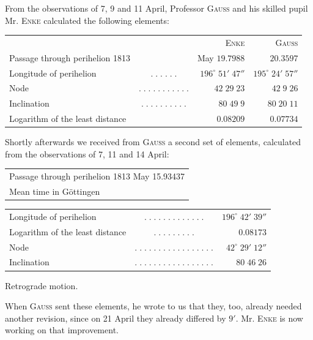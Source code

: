 \par\indent From the observations of 7, 9 and 11 April, Professor \textsc{Gauss} and his skilled pupil Mr. \textsc{Enke} calculated the following elements:

\begin{center}\fontsize{9}{11}\selectfont\setlength{\tabcolsep}{5pt}\renewcommand{\arraystretch}{1.15}\begin{tabular}{lcrr}
& & \textsc{Enke} & \textsc{Gauss}\\
Passage through perihelion 1813 & & May $19.7988$ & $20.3597$\\
Longitude of perihelion & $.\;.\;.\;.\;.\;.$ & $196^\circ\;51'\;47''$ & $195^\circ\;24'\;57''$\\
Node & $.\;.\;.\;.\;.\;.\;.\;.\;.\;.\;.$ & $42\;29\;23$ & $42\;9\;26$\\
Inclination & $.\;.\;.\;.\;.\;.\;.\;.\;.\;.$ & $80\;49\;9$ & $80\;20\;11$\\
Logarithm of the least distance &  & $0.08209$ & $0.07734$\\
\end{tabular}\end{center}

\par\indent Shortly afterwards we received from \textsc{Gauss} a second set of elements, calculated from the observations of 7, 11 and 14 April:

\begin{center}\fontsize{10}{12}\selectfont\setlength{\tabcolsep}{2pt}\renewcommand{\arraystretch}{1.15}\begin{tabular}{l}
Passage through perihelion 1813 May 15.93437\\Mean time in Göttingen\\
\end{tabular}\end{center}\begin{center}\fontsize{10}{12}\selectfont\setlength{\tabcolsep}{2pt}\renewcommand{\arraystretch}{1.15}\begin{tabular}{lcr}
Longitude of perihelion & $.\;.\;.\;.\;.\;.\;.\;.\;.\;.\;.\;.\;.$ & $196^\circ\;42'\;39''$\\
Logarithm of the least distance & $.\;.\;.\;.\;.\;.\;.\;.\;.$ & $0.08173$\\
Node & $.\;.\;.\;.\;.\;.\;.\;.\;.\;.\;.\;.\;.\;.\;.\;.\;.$ & $42^\circ\;29'\;12''$\\
Inclination & $.\;.\;.\;.\;.\;.\;.\;.\;.\;.\;.\;.\;.\;.\;.\;.\;.$ & $80\;46\;26$\\
\end{tabular}\end{center}

\noindent Retrograde motion.

\par\indent When \textsc{Gauss} sent these elements, he wrote to us that they, too, already needed another revision, since on 21 April they already differed by $9'$. Mr. \textsc{Enke} is now working on that improvement.
